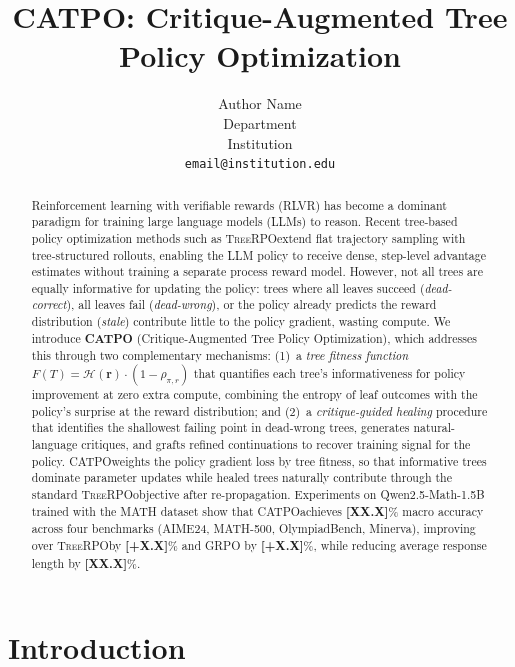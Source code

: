 \documentclass{article} %
\title{CATPO: Critique-Augmented Tree Policy Optimization}
\author{Author Name \\
Department \\
Institution \\
\texttt{email@institution.edu}
}
\newcommand{\CATPO}{\textsc{CATPO}}
\newcommand{\TreeRPO}{\textsc{TreeRPO}}
\newcommand{\placeholder}[1]{{\color{red}\textbf{[#1]}}}
\begin{document}
\maketitle

\begin{abstract}
Reinforcement learning with verifiable rewards (RLVR) has become a dominant paradigm for training large language models (LLMs) to reason. Recent tree-based policy optimization methods such as \TreeRPO extend flat trajectory sampling with tree-structured rollouts, enabling the LLM policy to receive dense, step-level advantage estimates without training a separate process reward model. However, not all trees are equally informative for updating the policy: trees where all leaves succeed (\emph{dead-correct}), all leaves fail (\emph{dead-wrong}), or the policy already predicts the reward distribution (\emph{stale}) contribute little to the policy gradient, wasting compute. We introduce \textbf{\CATPO} (Critique-Augmented Tree Policy Optimization), which addresses this through two complementary mechanisms: (1)~a \emph{tree fitness function} $F(T) = \mathcal{H}(\mathbf{r}) \cdot (1 - \rho_{\pi,r})$ that quantifies each tree's informativeness for policy improvement at zero extra compute, combining the entropy of leaf outcomes with the policy's surprise at the reward distribution; and (2)~a \emph{critique-guided healing} procedure that identifies the shallowest failing point in dead-wrong trees, generates natural-language critiques, and grafts refined continuations to recover training signal for the policy. \CATPO weights the policy gradient loss by tree fitness, so that informative trees dominate parameter updates while healed trees naturally contribute through the standard \TreeRPO objective after re-propagation. Experiments on Qwen2.5-Math-1.5B trained with the MATH dataset show that \CATPO achieves \placeholder{XX.X}\% macro accuracy across four benchmarks (AIME24, MATH-500, OlympiadBench, Minerva), improving over \TreeRPO by \placeholder{+X.X}\% and GRPO by \placeholder{+X.X}\%, while reducing average response length by \placeholder{XX.X}\%.
\end{abstract}


\section{Introduction}
\label{sec:intro}
\end{document}

